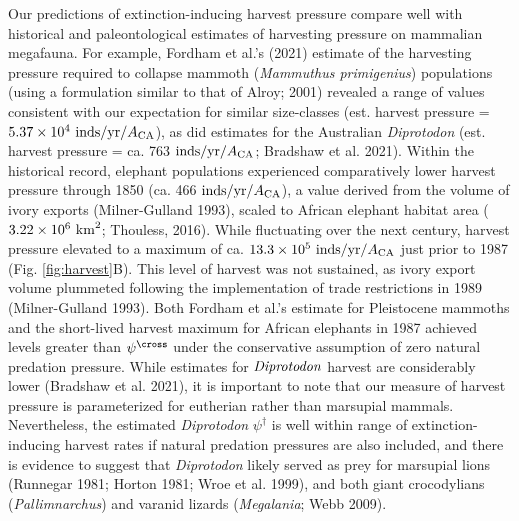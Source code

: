 \documentclass[11pt]{article}
\begin{document}
Our predictions of extinction-inducing harvest pressure compare well with historical and paleontological estimates of harvesting pressure on mammalian megafauna. 
For example, Fordham et al.'s (2021) estimate of the harvesting pressure required to collapse mammoth (\emph{Mammuthus primigenius}) populations (using a formulation similar to that of Alroy; 2001) revealed a range of values consistent with our expectation for similar size-classes (est. harvest pressure = $5.37\times10^4~{\rm inds/yr/}A_{\rm CA}$), as did estimates for the Australian \emph{Diprotodon} (est. harvest pressure = ca. 763 ${\rm inds/yr/}A_{\rm CA}$; Bradshaw et al. 2021).
Within the historical record, elephant populations experienced comparatively lower harvest pressure through 1850 (ca. 466  ${\rm inds/yr/}A_{\rm CA}$), a value derived from the volume of ivory exports (Milner-Gulland 1993), scaled to African elephant habitat area ($3.22\times 10^{6}~{\rm km}^2$; Thouless, 2016).
While fluctuating over the next century, harvest pressure elevated to a maximum of ca. $13.3\times 10^5~{\rm inds/yr/}A_{\rm CA}$ just prior to 1987 (Fig. \ref{fig:harvest}B).
This level of harvest was not sustained, as ivory export volume plummeted following the implementation of trade restrictions in 1989 (Milner-Gulland 1993).
Both Fordham et al.'s estimate for Pleistocene mammoths and the short-lived harvest maximum for African elephants in 1987 achieved levels greater than $\psi^\cross$ under the conservative assumption of zero natural predation pressure.
While estimates for $\emph{Diprotodon}$ harvest are considerably lower (Bradshaw et al. 2021), it is important to note that our measure of harvest pressure is parameterized for eutherian rather than marsupial mammals.
Nevertheless, the estimated \emph{Diprotodon} $\psi^\dagger$ is well within range of extinction-inducing harvest rates if natural predation pressures are also included, and there is evidence to suggest that \emph{Diprotodon} likely served as prey for marsupial lions (Runnegar 1981; Horton 1981; Wroe et al. 1999), and both giant crocodylians (\emph{Pallimnarchus}) and varanid lizards (\emph{Megalania}; Webb 2009).
\end{document}
